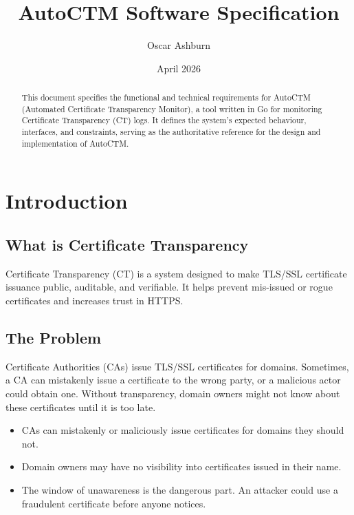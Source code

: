 \documentclass{article}
\title{AutoCTM Software Specification}
\author{Oscar Ashburn}
\date{April 2026}
\begin{document}
\maketitle

\begin{abstract}
This document specifies the functional and technical requirements for AutoCTM 
(Automated Certificate Transparency Monitor), a tool written in Go for 
monitoring Certificate Transparency (CT) logs. It defines the system's 
expected behaviour, interfaces, and constraints, serving as the authoritative 
reference for the design and implementation of AutoCTM.
\end{abstract}

\newpage

\section{Introduction}

\subsection{What is Certificate Transparency}

Certificate Transparency (CT) is a system designed to make TLS/SSL certificate 
issuance public, auditable, and verifiable. It helps prevent mis-issued or 
rogue certificates and increases trust in HTTPS.

\subsection{The Problem}

Certificate Authorities (CAs) issue TLS/SSL certificates for domains. 
Sometimes, a CA can mistakenly issue a certificate to the wrong party, or a 
malicious actor could obtain one. Without transparency, domain owners might 
not know about these certificates until it is too late.

\begin{itemize}
    \item CAs can mistakenly or maliciously issue certificates for domains 
    they should not.
    \item Domain owners may have no visibility into certificates issued in 
    their name.
    \item The window of unawareness is the dangerous part. An attacker could 
    use a fraudulent certificate before anyone notices.
\end{itemize}
\end{document}
